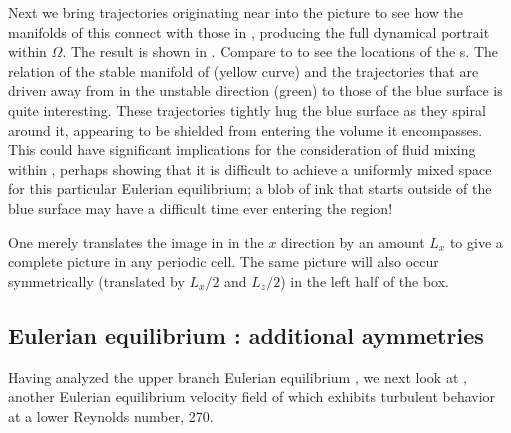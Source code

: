 \documentclass[lineno]{jfm}
\begin{document}
Next we bring trajectories originating near  into the picture to 
see how the manifolds of this {\stagp} connect with those in 
, producing the full dynamical portrait within 
$\Omega$.  The result is shown in . Compare to 
 to see the locations of the {\stagp}s. 
The relation of the stable manifold of  (yellow curve) and the 
trajectories that are driven away from  in the unstable direction 
(green) to those of the blue surface is quite interesting. These 
trajectories tightly hug the blue surface as they spiral around it, 
appearing to be shielded from entering the volume it encompasses. This 
could have significant implications for the consideration of fluid mixing 
within {\pCf}, perhaps showing that it is difficult to achieve a 
uniformly mixed space for this particular Eulerian equilibrium; a blob of ink that 
starts outside of the blue surface may have a difficult time ever 
entering the region! 
 
One merely translates the image in  in the $x$ 
direction by an amount $L_{x}$ to give a complete picture in any periodic 
cell. The same picture will also occur symmetrically (translated by 
$L_{x}/2$ and $L_{z}/2$) in the left half of the box. 


\subsection{Eulerian equilibrium {\tEQeight}: additional aymmetries}
\label{sect:EQ8}

Having analyzed the upper branch Eulerian equilibrium {\tEQtwo}, we next look at 
{\tEQeight}, another Eulerian equilibrium velocity field of {\pCf} which exhibits 
turbulent behavior at a lower Reynolds number, 270.
\end{document}
